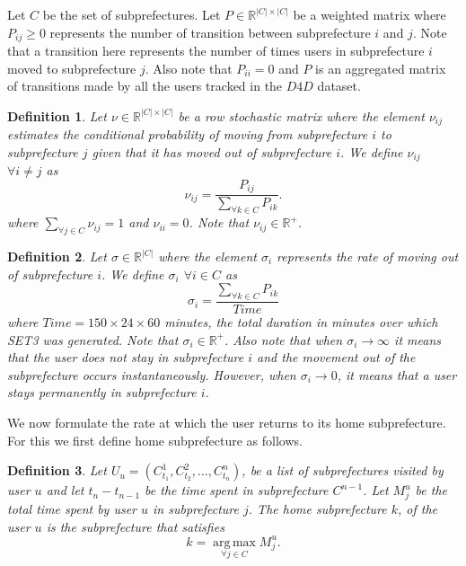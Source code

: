 \documentclass[review]{elsarticle}
\begin{document}
Let $C$ be the set of subprefectures. Let $P \in \mathbb{R}^{|C| \times |C|}$ be a weighted matrix where $P_{ij}\geq 0$ represents the number of transition between subprefecture $i$ and $j$. Note that a transition here represents the number of times users in subprefecture $i$ moved to subprefecture $j$. Also note that $P_{ii}=0$ and $P$ is an aggregated matrix of transitions made by all the users tracked in the $D4D$ dataset.

\newtheorem{definition}{Definition}



\begin{definition}\label{defmpv}
	Let $\nu\in \mathbb{R}^{|C|\times|C|}$ be a row stochastic matrix where the element $\nu_{ij}$ estimates the conditional probability of moving from subprefecture $i$ to subprefecture $j$ given that it has moved out of subprefecture $i$. We define $\nu_{ij}$ $\forall i \neq j$ as
	\begin{equation}\label{eq:mpv}
		\displaystyle \nu_{ij}=\frac{P_{ij}}{\sum_{\forall k \in C}P_{ik}}.
	\end{equation}
	where $\displaystyle \sum_{\forall j\in C}\nu_{ij}=1$ and $\nu_{ii}=0$. Note that $\nu_{ij} \in \mathbb{R}^+$.
\end{definition}

\begin{definition}\label{defmprv}
Let $\sigma\in \mathbb{R}^{|C|}$ where the element $\sigma_{i}$ represents the rate of moving out of subprefecture $i$. We define $\sigma_{i}$ $\forall i \in C$ as
\begin{equation}\label{eq:mprv}
\displaystyle \sigma_i=\frac{\sum_{\forall k \in C}P_{ik}}{Time}
\end{equation}
where $Time=150\times24\times60$ minutes, the total duration in minutes over which SET3 was generated. Note that $\sigma_{i} \in \mathbb{R}^+$. Also note that when $\sigma_{i}\rightarrow \infty$ it means that the user does not stay in subprefecture $i$ and the movement out of the subprefecture occurs instantaneously. However, when $\sigma_{i}\rightarrow 0$, it means that a user stays permanently in subprefecture $i$.
\end{definition}

We now formulate the rate at which the user returns to its home subprefecture. For this we first define home subprefecture as follows.

\begin{definition}\label{defhome}
Let $U_{u} = (C^{1}_{t_1}, C^{2}_{t_2}, \dots, C^{n}_{t_n})$, be a list of subprefectures visited by user $u$ and let  $t_{n} - t_{n-1}$ be the time spent in subprefecture $C^{n-1}$. Let  $M^{u}_j$ be the total time spent by user $u$ in subprefecture $j$. The home subprefecture $k$, of the user $u$ is the subprefecture that satisfies
\[k = \operatorname*{arg\,max}\limits_{\forall j \in C} M^{u}_j.\]
\end{definition}
\end{document}
